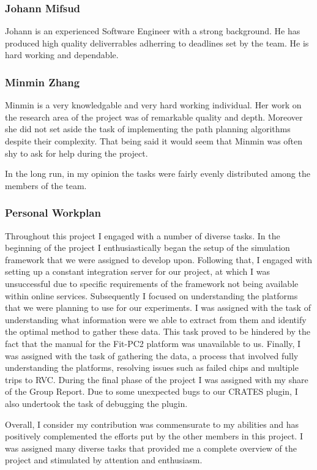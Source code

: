 \subsubsection{Johann Mifsud}
Johann is an experienced Software Engineer with a strong background. He
has produced high quality deliverrables adherring to deadlines set by the team.
He is hard working and dependable.

\subsubsection{Minmin Zhang}
Minmin is a very knowledgable and very hard working individual. Her work on the
research area of the project was of remarkable quality and depth. Moreover she
did not set aside the task of implementing the path planning algorithms despite
their complexity. That being said it would seem that Minmin was often shy to
ask for help during the project.

In the long run, in my opinion the tasks were fairly evenly distributed among
the members of the team.

\subsubsection{Personal Workplan}
Throughout this project I engaged with a number of diverse tasks. In the
beginning of the project I enthusiastically began the setup of the simulation
framework that we were assigned to develop upon. Following that, I engaged with
setting up a constant integration server for our project, at which I was
unsuccessful due to specific requirements of the framework not being available
within online services. Subsequently I focused on understanding the platforms
that we were planning to use for our experiments. I was assigned with the task
of understanding what information were we able to extract from them and identify
the optimal method to gather these data. This task proved to be hindered by the
fact that the manual for the Fit-PC2 platform was unavailable to us. Finally, I
was assigned with the task of gathering the data, a process that involved fully
understanding the platforms, resolving issues such as failed chips and multiple
trips to RVC. During the final phase of the project I was assigned with my share
of the Group Report. Due to some unexpected bugs to our CRATES plugin, I also
undertook the task of debugging the plugin.

Overall, I consider my contribution was commensurate to my abilities and has
positively complemented the efforts put by the other members in this project. I
was assigned many diverse tasks that provided me a complete overview of the
project and stimulated by attention and enthusiasm.

